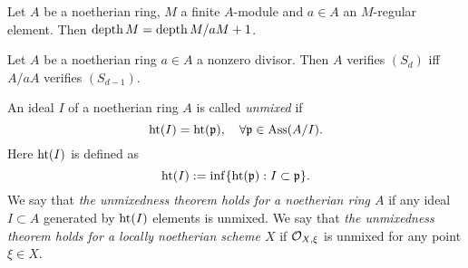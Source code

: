         

    \begin{corollary}\label{cor: induction on depth}
        Let $A$ be a noetherian ring, $M$ a finite $A$-module and $a \in A$ an $M$-regular element.
        Then $\operatorname{depth} M = \operatorname{depth} M/aM + 1$.
    \end{corollary}

    \begin{corollary}\label{cor: induction on S_d conditions}
        Let $A$ be a noetherian ring $a \in A$ a nonzero divisor.
        Then $A$ verifies $(S_d)$ iff $A/aA$ verifies $(S_{d-1})$.
    \end{corollary}

    \begin{definition}\label{def: unmixedness theorem}
        An ideal $I$ of a noetherian ring $A$ is called \textit{unmixed} if 
        \[ \operatorname{ht}(I) = \operatorname{ht}({\mathfrak{p}}), \quad \forall {\mathfrak{p}} \in \operatorname{Ass}(A/I). \]
        Here $\operatorname{ht}(I)$ is defined as 
        \[ \operatorname{ht}(I) := \inf \{ \operatorname{ht}({\mathfrak{p}}) : I \subset {\mathfrak{p}} \}. \]
        We say that \textit{the unmixedness theorem holds for a noetherian ring $A$} if any ideal $I \subset A$ generated by $\operatorname{ht}(I)$ elements is unmixed.
        We say that \textit{the unmixedness theorem holds for a locally noetherian scheme $X$} if ${\mathcal{O}}_{X,\xi}$ is unmixed for any point $\xi \in X$.
    \end{definition}


